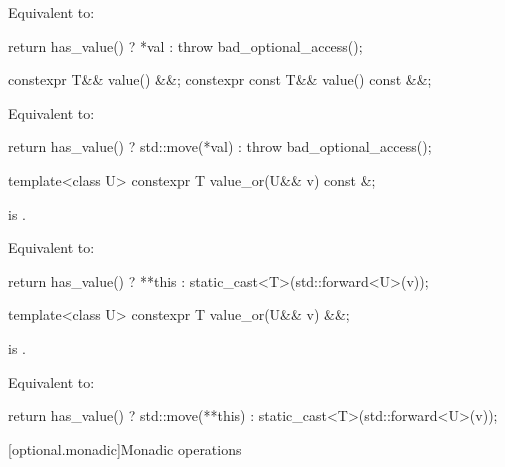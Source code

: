\begin{itemdescr}
\pnum
\effects
Equivalent to:
\begin{codeblock}
return has_value() ? *val : throw bad_optional_access();
\end{codeblock}
\end{itemdescr}

%
\begin{itemdecl}
constexpr T&& value() &&;
constexpr const T&& value() const &&;
\end{itemdecl}

\begin{itemdescr}

\pnum
\effects
Equivalent to:
\begin{codeblock}
return has_value() ? std::move(*val) : throw bad_optional_access();
\end{codeblock}
\end{itemdescr}

%
\begin{itemdecl}
template<class U> constexpr T value_or(U&& v) const &;
\end{itemdecl}

\begin{itemdescr}
\pnum
\mandates
{} is .

\pnum
\effects
Equivalent to:
\begin{codeblock}
return has_value() ? **this : static_cast<T>(std::forward<U>(v));
\end{codeblock}
\end{itemdescr}

%
\begin{itemdecl}
template<class U> constexpr T value_or(U&& v) &&;
\end{itemdecl}

\begin{itemdescr}
\pnum
\mandates
{} is .

\pnum
\effects
Equivalent to:
\begin{codeblock}
return has_value() ? std::move(**this) : static_cast<T>(std::forward<U>(v));
\end{codeblock}
\end{itemdescr}

[optional.monadic]{Monadic operations}

